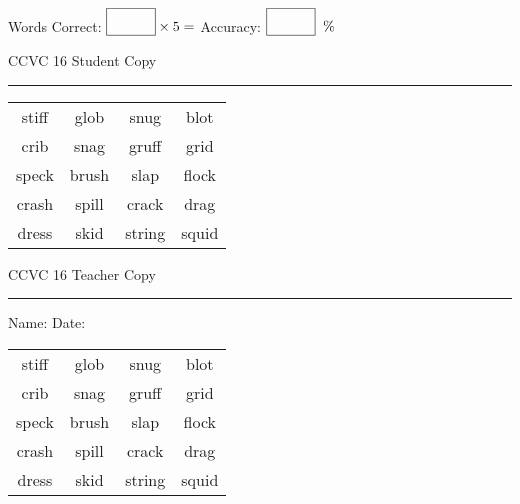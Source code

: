 \documentclass{memoir}
\begin{document}
\normalsize

Words Correct: $\fbox{\phantom{\huge 100}} \times 5 = $ Accuracy: $\fbox{\phantom{\huge 100}}\;\; \%$ 

\vfill

\newpage


\footnotesize \noindent
CCVC 16 \hfill Student Copy
\smallskip
\hrule

\Large

\setlength{\tabcolsep}{14pt}
\def\arraystretch{3}

{\selectfont


\begin{vplace}[0.5]
\begin{center}
\begin{tabular}{cccc}
stiff & glob & snug & blot \\
crib & snag & gruff & grid \\
speck & brush & slap            & flock \\
crash & spill & crack       & drag        \\
dress & skid & string & squid \\
\end{tabular}
\end{center}
\end{vplace}

}

\newpage

\footnotesize \noindent
CCVC 16 \hfill Teacher Copy
\smallskip
\hrule

\normalsize

\vfill

\noindent
Name: \underline{\hspace{1.75in}} \hfill Date: \underline{\hspace{1in}}

\Large

{\selectfont


\begin{vplace}[0.5]
\begin{center}
\begin{tabular}{cccc}
stiff & glob & snug & blot \\
crib & snag & gruff & grid \\
speck & brush & slap            & flock \\
crash & spill & crack       & drag        \\
dress & skid & string & squid \\
\end{tabular}
\end{center}
\end{vplace}



}
\end{document}
